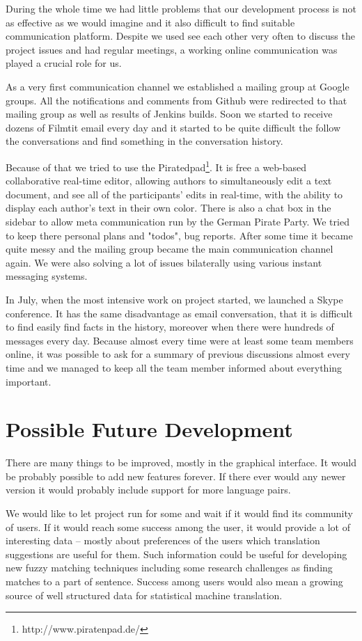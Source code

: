 During the whole time we had little problems that our development process is not as effective as we would imagine and it also difficult to find suitable communication platform. Despite we used see each other very often to discuss the project issues and had regular meetings, a working online communication was played a crucial role for us.

As a very first communication channel we established a mailing group at Google groups. All the notifications and comments from Github were redirected to that mailing group as well as results of Jenkins builds. Soon we started to receive dozens of Filmtit email every day and it started to be quite difficult the follow the conversations and find something in the conversation history.

Because of that we tried to use the Piratedpad\footnote{http://www.piratenpad.de/}. It is free a web-based collaborative real-time editor, allowing authors to simultaneously edit a text document, and see all of the participants' edits in real-time, with the ability to display each author's text in their own color. There is also a chat box in the sidebar to allow meta communication run by the German Pirate Party. We tried to keep there personal plans and "todos", bug reports. After some time it became quite messy and the mailing group became the main communication channel again. We were also solving a lot of issues bilaterally using various instant messaging systems.

In July, when the most intensive work on project started, we launched a Skype conference. It has the same disadvantage as email conversation, that it is difficult to find easily find facts in the history, moreover when there were hundreds of messages every day. Because almost every time were at least some team members online, it was possible to ask for a summary of previous discussions almost every time and we managed to keep all the team member informed about everything important.

\section{Possible Future Development}

There are many things to be improved, mostly in the graphical interface. It would be probably possible to add new features forever. If there ever would any newer version it would probably include support for more language pairs.

We would like to let project run for some and wait if it would find its community of users. If it would reach some success among the user, it would provide a lot of interesting data -- mostly about preferences of the users which translation suggestions are useful for them. Such information could be useful for developing new fuzzy matching techniques including some research challenges as finding matches to a part of sentence. Success among users would also mean a growing source of well structured data for statistical machine translation.